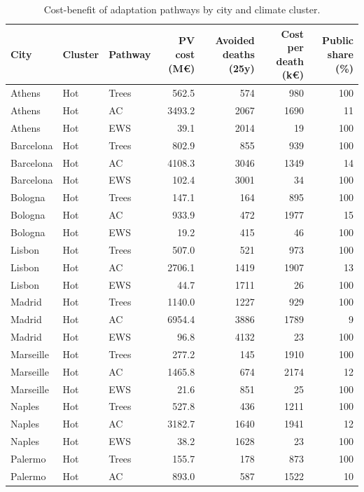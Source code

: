 \begin{table}[ht]
\centering
\caption{Cost-benefit of adaptation pathways by city and climate cluster.} 
\label{tab:cba_by_city}
\begin{tabular}{lllrrrr}
  \toprule
City & Cluster & Pathway & PV cost (M€) & Avoided deaths (25y) & Cost per death (k€) & Public share (\%) \\ 
  \midrule
Athens & Hot & Trees & 562.5 & 574 & 980 & 100 \\ 
  Athens & Hot & AC & 3493.2 & 2067 & 1690 & 11 \\ 
  Athens & Hot & EWS & 39.1 & 2014 & 19 & 100 \\ 
  Barcelona & Hot & Trees & 802.9 & 855 & 939 & 100 \\ 
  Barcelona & Hot & AC & 4108.3 & 3046 & 1349 & 14 \\ 
  Barcelona & Hot & EWS & 102.4 & 3001 & 34 & 100 \\ 
  Bologna & Hot & Trees & 147.1 & 164 & 895 & 100 \\ 
  Bologna & Hot & AC & 933.9 & 472 & 1977 & 15 \\ 
  Bologna & Hot & EWS & 19.2 & 415 & 46 & 100 \\ 
  Lisbon & Hot & Trees & 507.0 & 521 & 973 & 100 \\ 
  Lisbon & Hot & AC & 2706.1 & 1419 & 1907 & 13 \\ 
  Lisbon & Hot & EWS & 44.7 & 1711 & 26 & 100 \\ 
  Madrid & Hot & Trees & 1140.0 & 1227 & 929 & 100 \\ 
  Madrid & Hot & AC & 6954.4 & 3886 & 1789 & 9 \\ 
  Madrid & Hot & EWS & 96.8 & 4132 & 23 & 100 \\ 
  Marseille & Hot & Trees & 277.2 & 145 & 1910 & 100 \\ 
  Marseille & Hot & AC & 1465.8 & 674 & 2174 & 12 \\ 
  Marseille & Hot & EWS & 21.6 & 851 & 25 & 100 \\ 
  Naples & Hot & Trees & 527.8 & 436 & 1211 & 100 \\ 
  Naples & Hot & AC & 3182.7 & 1640 & 1941 & 12 \\ 
  Naples & Hot & EWS & 38.2 & 1628 & 23 & 100 \\ 
  Palermo & Hot & Trees & 155.7 & 178 & 873 & 100 \\ 
  Palermo & Hot & AC & 893.0 & 587 & 1522 & 10 \\ 

\end{tabular}
\end{table}
